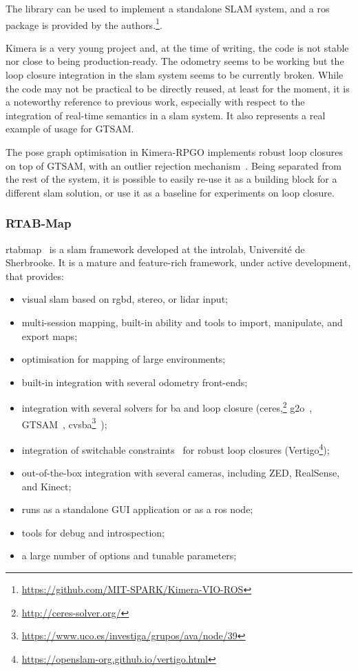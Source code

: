 \documentclass[11pt, letterpaper, twoside]{article}
\begin{document}
The library can be used to implement a standalone SLAM system, and a \gls{ros}
package is provided by the
authors.\footnote{\url{https://github.com/MIT-SPARK/Kimera-VIO-ROS}}.

Kimera is a very young project and, at the time of writing, the code is not
stable nor close to being production-ready. The odometry seems to be working
but the loop closure integration in the \gls{slam} system seems to be currently
broken. While the code may not be practical to be directly reused, at least for
the moment, it is a noteworthy reference to previous work, especially with
respect to the integration of real-time semantics in a \gls{slam} system. It
also represents a real example of usage for GTSAM.

The pose graph optimisation in Kimera-RPGO implements robust loop closures on
top of GTSAM, with an outlier rejection mechanism~\cite{mangelson2018pairwise}.
Being separated from the rest of the system, it is possible to easily re-use it
as a building block for a different \gls{slam} solution, or use it as a
baseline for experiments on loop closure.

\subsubsection{RTAB-Map}

\gls{rtabmap}~\cite{labbe2019rtab} is a \gls{slam} framework developed at the
\gls{introlab}, Université de Sherbrooke. It is a mature and feature-rich
framework, under active development, that provides:
\begin{itemize}
    \item visual \gls{slam} based on \gls{rgbd}, stereo, or lidar input;
    \item multi-session mapping, built-in ability and tools to import,
        manipulate, and export maps;
    \item optimisation for mapping of large environments;
    \item built-in integration with several odometry front-ends;
    \item integration with several solvers for \gls{ba} and loop closure
        (ceres,\footnote{\url{http://ceres-solver.org/}}
        g2o~\cite{grisetti2011g2o}, GTSAM~\cite{dellaert2006square},
        cvsba\footnote{\url{https://www.uco.es/investiga/grupos/ava/node/39}}~\cite{lourakis2009sba});
    \item integration of switchable constraints~\cite{sunderhauf2012switchable}
        for robust loop closures
        (Vertigo\footnote{\url{https://openslam-org.github.io/vertigo.html}});
    \item out-of-the-box integration with several cameras, including ZED,
        RealSense, and Kinect;
    \item runs as a standalone GUI application or as a \gls{ros} node;
    \item tools for debug and introspection;
    \item a large number of options and tunable parameters;
\end{itemize}
\end{document}
